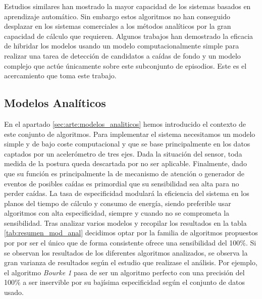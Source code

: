 Estudios similares han mostrado la mayor capacidad de los sistemas basados en aprendizaje automático. Sin embargo estos algoritmos no han conseguido desplazar en los sistemas comerciales a los métodos analíticos por la gran capacidad de cálculo que requieren. Algunos trabajos han demostrado la eficacia de hibridar los modelos usando un modelo computacionalmente simple para realizar una tarea de detección de candidatos a caídas de fondo y un modelo complejo que actúe únicamente sobre este subconjunto de episodios. Este es el acercamiento que toma este trabajo.

\subsection{Modelos Analíticos}

En el apartado \ref{sec:arte:modelos_analiticos} hemos introducido el contexto de este conjunto de algoritmos. Para implementar el sistema necesitamos un modelo simple y de bajo coste computacional y que se base principalmente en los datos captados por un acelerómetro de tres ejes. Dada la situación del sensor, toda medida de la postura queda descartada por no ser aplicable. Finalmente, dado que su función es principalmente la de mecanismo de atención o generador de eventos de posibles caídas es primordial que su sensibilidad sea alta para no perder caídas. La tasa de especificidad modulará la eficiencia del sistema en los planos del tiempo de cálculo y consumo de energía, siendo preferible usar algoritmos con alta especificidad, siempre y cuando no se comprometa la sensibilidad. Tras analizar varios modelos y recopilar los resultados en la tabla \ref{tab:resumen_mod_anal} decidimos optar por la familia de algoritmos propuestos por \cite{Bourke2006} por ser el único que de forma consistente ofrece una sensibilidad del 100\%. Si se observan los resultados de los diferentes algoritmos analizados, se observa la gran varianza de resultados según el estudio que realizase el análisis. Por ejemplo, el algoritmo \textit{Bourke 1} pasa de ser un algoritmo perfecto con una precisión del 100\% a ser inservible por su bajísima especificidad según el conjunto de datos usado.

